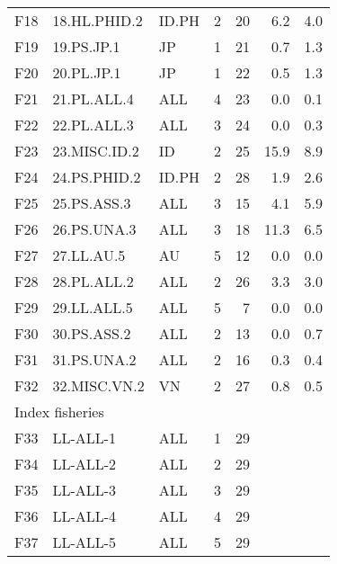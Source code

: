 \begin{table}[h]
\begin{tabular}{lllrrrr}
    F18 & 18.HL.PHID.2 & ID.PH & 2 & 20 &  6.2 &  4.0\\
    F19 & 19.PS.JP.1   & JP    & 1 & 21 &  0.7 &  1.3\\
    F20 & 20.PL.JP.1   & JP    & 1 & 22 &  0.5 &  1.3\\
    F21 & 21.PL.ALL.4  & ALL   & 4 & 23 &  0.0 &  0.1\\
    F22 & 22.PL.ALL.3  & ALL   & 3 & 24 &  0.0 &  0.3\\
    F23 & 23.MISC.ID.2 & ID    & 2 & 25 & 15.9 &  8.9\\
    F24 & 24.PS.PHID.2 & ID.PH & 2 & 28 &  1.9 &  2.6\\
    F25 & 25.PS.ASS.3  & ALL   & 3 & 15 &  4.1 &  5.9\\
    F26 & 26.PS.UNA.3  & ALL   & 3 & 18 & 11.3 &  6.5\\
    F27 & 27.LL.AU.5   & AU    & 5 & 12 &  0.0 &  0.0\\
    F28 & 28.PL.ALL.2  & ALL   & 2 & 26 &  3.3 &  3.0\\
    F29 & 29.LL.ALL.5  & ALL   & 5 &  7 &  0.0 &  0.0\\
    F30 & 30.PS.ASS.2  & ALL   & 2 & 13 &  0.0 &  0.7\\
    F31 & 31.PS.UNA.2  & ALL   & 2 & 16 &  0.3 &  0.4\\
    F32 & 32.MISC.VN.2 & VN    & 2 & 27 &  0.8 &  0.5\\
    \hline
    \multicolumn{7}{l}{Index fisheries}\\
    \hline
    F33 & LL-ALL-1     & ALL   & 1 & 29\\
    F34 & LL-ALL-2     & ALL   & 2 & 29\\
    F35 & LL-ALL-3     & ALL   & 3 & 29\\
    F36 & LL-ALL-4     & ALL   & 4 & 29\\
    F37 & LL-ALL-5     & ALL   & 5 & 29\\
    \hline
  \end{tabular}
\end{table}

\clearpage

